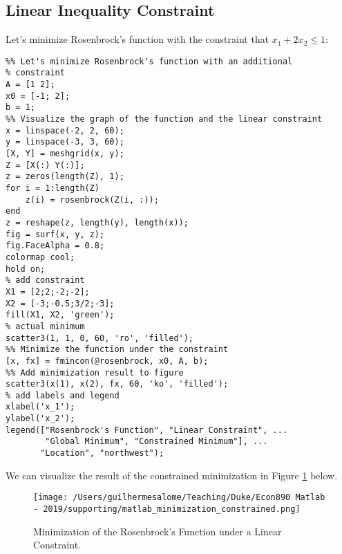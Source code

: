 \documentclass[12pt, a4paper]{article}
\begin{document}
\subsection{Linear Inequality Constraint}
\label{sec:org45daa11}
Let's minimize Rosenbrock's function with the constraint that \(x_1 + 2x_2 \leq 1\):
\lstset{language=matlab,label= ,caption= ,captionpos=b,firstnumber=1,numbers=left,style=Matlab-editor}
\begin{lstlisting}
%% Let's minimize Rosenbrock's function with an additional
% constraint
A = [1 2];
x0 = [-1; 2];
b = 1;
%% Visualize the graph of the function and the linear constraint
x = linspace(-2, 2, 60);
y = linspace(-3, 3, 60);
[X, Y] = meshgrid(x, y);
Z = [X(:) Y(:)];
z = zeros(length(Z), 1);
for i = 1:length(Z)
    z(i) = rosenbrock(Z(i, :));
end
z = reshape(z, length(y), length(x));
fig = surf(x, y, z);
fig.FaceAlpha = 0.8;
colormap cool;
hold on;
% add constraint
X1 = [2;2;-2;-2];
X2 = [-3;-0.5;3/2;-3];
fill(X1, X2, 'green');
% actual minimum
scatter3(1, 1, 0, 60, 'ro', 'filled');
%% Minimize the function under the constraint
[x, fx] = fmincon(@rosenbrock, x0, A, b);
%% Add minimization result to figure
scatter3(x(1), x(2), fx, 60, 'ko', 'filled');
% add labels and legend
xlabel('x_1');
ylabel('x_2');
legend(["Rosenbrock's Function", "Linear Constraint", ...
        "Global Minimum", "Constrained Minimum"], ...
       "Location", "northwest");
\end{lstlisting}
We can visualize the result of the constrained minimization in Figure \ref{fig:org788df26} below.

\begin{figure}[H]
\centering
\texttt{[image: /Users/guilhermesalome/Teaching/Duke/Econ890 Matlab - 2019/supporting/matlab\_minimization\_constrained.png]}
\caption{\label{fig:org788df26}
Minimization of the Rosenbrock's Function under a Linear Constraint.}
\end{figure}
\end{document}
